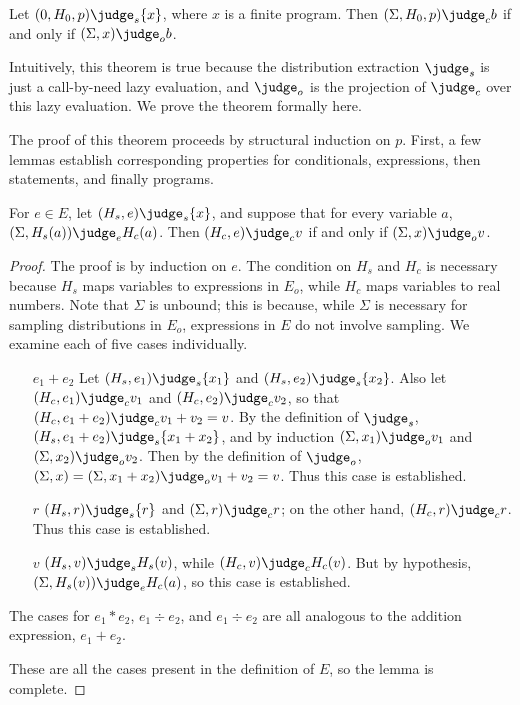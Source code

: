\begin{theorem} \label{passert:thm:main}
Let $(0, H_0, p) \judge_s \{ x \}$, where $x$ is a finite program.
Then $(\Sigma, H_0, p) \judge_c b$ if and only if $(\Sigma, x) \judge_o b$.
\end{theorem}

Intuitively, this theorem is true because the distribution extraction
$\judge_s$ is just a call-by-need lazy evaluation, and $\judge_o$ is
the projection of $\judge_c$ over this lazy evaluation.  We prove the
theorem formally here.

The proof of this theorem proceeds by structural induction on $p$.
First, a few lemmas establish corresponding properties for
conditionals, expressions, then statements, and finally programs.

\begin{lemma} \label{passert:lem:expr}
  For $e \in E$, let $(H_s, e) \judge_s \{ x \}$, and suppose that for
  every variable $a$, $(\Sigma, H_s(a)) \judge_e H_c(a)$.  Then $(H_c,
  e) \judge_c v$ if and only if $(\Sigma, x) \judge_o v$.
\end{lemma}

\begin{proof}
The proof is by induction on $e$.  The condition on $H_s$ and $H_c$ is
necessary because $H_s$ maps variables to expressions in $E_o$, while
$H_c$ maps variables to real numbers.  Note that $\Sigma$ is unbound;
this is because, while $\Sigma$ is necessary for sampling
distributions in $E_o$, expressions in $E$ do not involve sampling.
We examine each of five cases individually.

\begin{itemize}
\item[$e_1 + e_2$] Let $(H_s, e_1) \judge_s \{ x_1 \}$ and $(H_s, e_2)
  \judge_s \{ x_2 \}$. Also let $(H_c, e_1) \judge_c v_1$ and $(H_c,
  e_2) \judge_c v_2$, so that $(H_c, e_1 + e_2) \judge_c v_1 + v_2 =
  v$.  By the definition of $\judge_s$, $(H_s, e_1 + e_2) \judge_s \{
  x_1 + x_2 \}$, and by induction $(\Sigma, x_1) \judge_o v_1$ and
  $(\Sigma, x_2) \judge_o v_2$.  Then by the definition of $\judge_o$,
  $(\Sigma, x) = (\Sigma, x_1 + x_2) \judge_o v_1 + v_2 = v$.  Thus
  this case is established.
\item[$r$] $(H_s, r) \judge_s \{ r \}$ and $(\Sigma, r) \judge_c r$;
  on the other hand, $(H_c, r) \judge_c r$.  Thus this case is
  established.
\item[$v$] $(H_s, v) \judge_s H_s(v)$, while $(H_c, v) \judge_c
  H_c(v)$.  But by hypothesis, $(\Sigma, H_s(v)) \judge_e H_c(a)$, so
  this case is established.
\end{itemize}

The cases for $e_1 * e_2$, $e_1 \div e_2$, and $e_1 \div e_2$ are all
analogous to the addition expression, $e_1 + e_2$.

These are all the cases present in the definition of $E$, so the lemma
is complete.
\end{proof}

